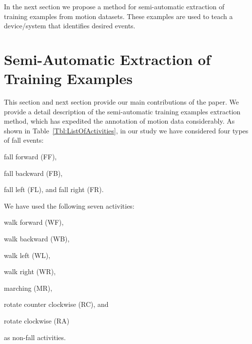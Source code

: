 \documentclass{IEEEtran}
\begin{document}
\par 

In the next section we propose a method for semi-automatic extraction of training examples from motion datasets. These examples are used to teach a device/system that identifies desired events. 

\section{Semi-Automatic Extraction of  Training Examples}
\label{sec:SemiAutomaticExtractionOfTrainingVectors}

This section  and next section provide our main contributions of the paper. We provide a detail description 
of the semi-automatic training examples extraction method, which has expedited the 
annotation 
of motion data considerably. As shown in Table~\ref{Tbl:ListOfActivities}, in our study we have considered four types of fall events: 
\begin{inparaenum}[1)] \item fall forward ({\sf FF}), \item fall backward ({\sf FB}), 
\item fall left ({\sf FL}), and fall right ({\sf FR}). \end{inparaenum} We have used the 
following seven activities:\begin{inparaenum}[1)] \item walk forward ({\sf WF}), \item 
walk backward ({\sf WB}), \item walk left ({\sf WL}), \item walk right ({\sf WR}), \item 
marching ({\sf MR}), \item rotate counter clockwise ({\sf RC}), and \item rotate 
clockwise ({\sf RA})  \end{inparaenum} as non-fall activities. 
\end{document}
